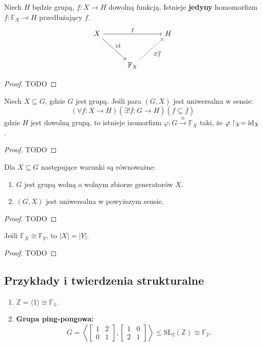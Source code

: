\begin{theorem}
    Niech $H$ będzie grupą, $f: X \to H$ dowolną funkcją. Istnieje \textbf{jedyny} homomorfizm $\overline{f}: \mathbb{F}_X \to H$ przedłużający $f$.
    \[
    \begin{tikzcd}[row sep=30pt, column sep=30pt]
    X \arrow[dr, "\id"] \arrow[rr, "f"] & & H \\
    & \mathbb{F}_X \arrow[ur, "\exists ! \overline{f}"', dashed] &
    \end{tikzcd}
    \]
\end{theorem}
\begin{proof}
    TODO
\end{proof} 
\begin{theorem}
    Niech $X \subseteq G$, gdzie $G$ jest grupą. Jeśli para $(G, X)$ jest uniwersalna w sensie:
		\[
		    \left(\forall f: X\to H \right)\left(\exists ! \overline{f}:G\to H   \right)\left( f \subseteq \overline{f}   \right)    
		\]
    gdzie $H$ jest dowolną grupą, to istnieje izomorfizm $\varphi: G \overset{\cong}{\to} \mathbb{F}_X$ taki, że $\varphi\restriction_{X}   = \operatorname{id}_X$.
\end{theorem}
\begin{proof}
    TODO
\end{proof} 
\begin{corollary}
    Dla $X \subseteq G$ następujące warunki są równoważne:
    \begin{enumerate}[label=\arabic*)]
        \item $G$ jest grupą wolną o wolnym zbiorze generatorów $X$.
        \item $(G, X)$ jest uniwersalna w powyższym sensie.
    \end{enumerate}
\end{corollary}
\begin{proof}
    TODO
\end{proof} 
\begin{theorem}
    Jeśli $\mathbb{F}_X \cong \mathbb{F}_Y$, to $|X| = |Y|$.
\end{theorem}
\begin{proof}
    TODO
\end{proof} 
\subsection*{Przykłady i twierdzenia strukturalne}

\begin{enumerate}
    \item $\mathbb{Z} = \langle 1 \rangle \cong \mathbb{F}_1$.
    \item \textbf{Grupa ping-pongowa:}
    \[
    G = \left\langle 
    \begin{bmatrix} 1 & 2 \\ 0 & 1 \end{bmatrix},
    \begin{bmatrix} 1 & 0 \\ 2 & 1 \end{bmatrix}
    \right\rangle \le \mathrm{SL}_2(\mathbb{Z}) \cong \mathbb{F}_2.
    \]
\end{enumerate}

